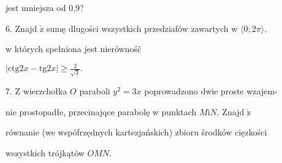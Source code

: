 \documentclass[a4paper,12pt]{article}
\begin{document}
jest mniejsza od 0,9?

6. Znajd $\acute{\mathrm{z}}$ sumę dlugości wszystkich przedziafów zawartych w $\langle 0;2\pi\rangle,$

w których spełniona jest nierównośč

$|\displaystyle \mathrm{c}\mathrm{t}\mathrm{g}2x-\mathrm{t}\mathrm{g}2x|\geq\frac{2}{\sqrt{3}}.$

7. $\mathrm{Z}$ wierzchołka $O$ paraboli $y^{2}=3x$ poprowadzono dwie proste wzajem-

nie prostopadłe, przecinajqce parabolę w punktach $M \mathrm{i} N.$ Znajd $\acute{\mathrm{z}}$

równanie (we wspófrzędnych kartezjańskich) zbioru środków cięzkości

wszystkich trójkątów $OMN.$
\end{document}

